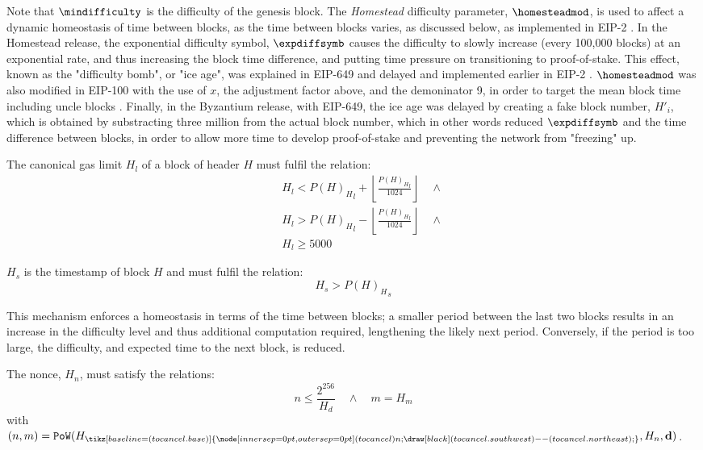 \documentclass[9pt,oneside]{amsart}
\newcommand{\hcancel}[1]{%
    \tikz[baseline=(tocancel.base)]{
        \node[inner sep=0pt,outer sep=0pt] (tocancel) {#1};
        \draw[black] (tocancel.south west) -- (tocancel.north east);
    }%
}%
\begin{document}
\begin{multicols}{2}
Note that $\mindifficulty$ is the difficulty of the genesis block. The \textit{Homestead} difficulty parameter, $\homesteadmod$, is used to affect a dynamic homeostasis of time between blocks, as the time between blocks varies, as discussed below, as implemented in EIP-2 \cite{EIP-2}. In the Homestead release, the exponential difficulty symbol, $\expdiffsymb$ causes the difficulty to slowly increase (every 100,000 blocks) at an exponential rate, and thus increasing the block time difference, and putting time pressure on transitioning to proof-of-stake. This effect, known as the "difficulty bomb", or "ice age", was explained in EIP-649 \cite{EIP-649} and delayed and implemented earlier in EIP-2 \cite{EIP-2}. $\homesteadmod$ was also modified in EIP-100 with the use of $x$, the adjustment factor above, and the demoninator 9, in order to target the mean block time including uncle blocks \cite{EIP-100}. Finally, in the Byzantium release, with EIP-649, the ice age was delayed by creating a fake block number, $H'_i$, which is obtained by substracting three million from the actual block number, which in other words reduced $\expdiffsymb$ and the time difference between blocks, in order to allow more time to develop proof-of-stake and preventing the network from "freezing" up.

The canonical gas limit $H_l$ of a block of header $H$ must fulfil the relation:
\begin{eqnarray}
& & H_l < {P(H)_H}_l + \left\lfloor\frac{{P(H)_H}_l}{1024}\right\rfloor \quad \wedge \\
& & H_l > {P(H)_H}_l - \left\lfloor\frac{{P(H)_H}_l}{1024}\right\rfloor \quad \wedge \\
& & H_l \geqslant 5000
\end{eqnarray}

$H_s$ is the timestamp of block $H$ and must fulfil the relation:
\begin{equation}
H_s > {P(H)_H}_s
\end{equation}

This mechanism enforces a homeostasis in terms of the time between blocks; a smaller period between the last two blocks results in an increase in the difficulty level and thus additional computation required, lengthening the likely next period. Conversely, if the period is too large, the difficulty, and expected time to the next block, is reduced.

The nonce, $H_n$, must satisfy the relations:
\begin{equation}
n \leqslant \frac{2^{256}}{H_d} \quad \wedge \quad m = H_m
\end{equation}
with $(n, m) = \mathtt{PoW}(H_{\hcancel{n}}, H_n, \mathbf{d})$.


\end{multicols}
\end{document}
